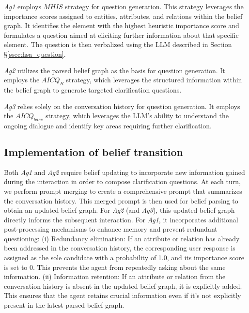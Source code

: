 \textit{Ag1} employs $MHIS$ strategy for question generation. This strategy leverages the importance scores assigned to entities, attributes, and relations within the belief graph. It identifies the element with the highest heuristic importance score and formulates a question aimed at eliciting further information about that specific element.  The question is then verbalized using the LLM described in Section \S\ref{ssec:hsa_question}.

\textit{Ag2} utilizes the parsed belief graph as the basis for question generation. It employs the $AICQ_{B}$ strategy, which leverages the structured information within the belief graph to generate targeted clarification questions.

\textit{Ag3} relies solely on the conversation history for question generation. It employs the $AICQ_{base}$ strategy, which leverages the LLM's ability to understand the ongoing dialogue and identify key areas requiring further clarification.



\subsection{Implementation of belief transition} 
\label{sssec:transition_implementation}

 Both \textit{Ag1} and \textit{Ag2} require belief updating to incorporate new information gained during the interaction in order to compose clarification questions. At each turn, we perform prompt merging to create a comprehensive prompt that summarizes the conversation history. This merged prompt is then used for belief parsing to obtain an updated belief graph. For \textit{Ag2} (and \textit{Ag3}), this updated belief graph directly informs the subsequent interaction. For \textit{Ag1}, it incorporates additional post-processing mechanisms to enhance memory and prevent redundant questioning: (i) Redundancy elimination: If an attribute or relation has already been addressed in the conversation history, the corresponding user response is assigned as the sole candidate with a probability of 1.0, and its importance score is set to 0. This prevents the agent from repeatedly asking about the same information. (ii) Information retention: If an attribute or relation from the conversation history is absent in the updated belief graph, it is explicitly added. This ensures that the agent retains crucial information even if it's not explicitly present in the latest parsed belief graph.

